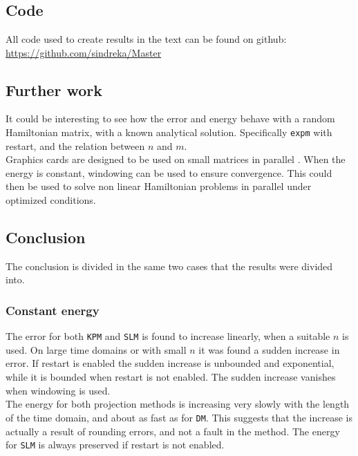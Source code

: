\chapter{  }
\section{Code}
All code used to create results in the text can be found on github: \\
\url{https://github.com/sindreka/Master}
\section{Further work}
It could be interesting to see how the error and energy behave with a random Hamiltonian matrix, with a known analytical solution. Specifically \texttt{expm} with restart, and the relation between $n$ and $m$. \\

\noindent Graphics cards are designed to be used on small matrices in parallel \cite{graphics}. When the energy is constant, windowing can be used to ensure convergence. This could then be used to solve non linear Hamiltonian problems in parallel under optimized conditions. \\

\section{Conclusion}
The conclusion is divided in the same two cases that the results were divided into.
\subsection{Constant energy} %
The error for both \texttt{KPM} and \texttt{SLM} is found to increase linearly, when a suitable $n$ is used. On large time domains or with small $n$ it was found a sudden increase in error. If restart is enabled the sudden increase is unbounded and exponential, while it is bounded when restart is not enabled.
The sudden increase vanishes when windowing is used. \\

\noindent The energy for both projection methods is increasing very slowly with the length of the time domain, and about as fast as for \texttt{DM}. This suggests that the increase is actually a result of rounding errors, and not a fault in the method. The energy for \texttt{SLM} is always preserved if restart is not enabled.


